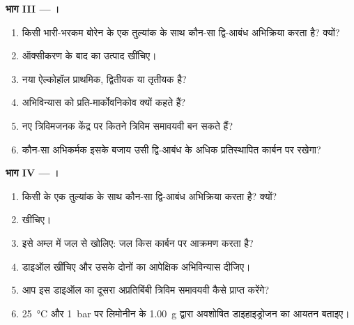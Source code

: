 \begin{problem}
\medskip
\noindent\textbf{भाग III --- ।}
\begin{enumerate}[resume]
  \item किसी भारी-भरकम बोरेन के एक तुल्यांक के साथ कौन-सा द्वि-आबंध अभिक्रिया करता है? क्यों?
  \item ऑक्सीकरण के बाद का उत्पाद खींचिए।
  \item नया ऐल्कोहॉल प्राथमिक, द्वितीयक या तृतीयक है?
  \item अभिविन्यास को प्रति-मार्कोवनिकोव क्यों कहते हैं?
  \item नए त्रिविमजनक केंद्र पर कितने त्रिविम समावयवी बन सकते हैं?
  \item कौन-सा अभिकर्मक इसके बजाय उसी द्वि-आबंध के अधिक प्रतिस्थापित कार्बन पर 
        रखेगा?
\end{enumerate}

\medskip
\noindent\textbf{भाग IV --- ।}
\begin{enumerate}[resume]
  \item किसी  के एक तुल्यांक के साथ कौन-सा द्वि-आबंध अभिक्रिया करता है? क्यों?
  \item {} खींचिए।
  \item इसे अम्ल में जल से खोलिए: जल किस कार्बन पर आक्रमण करता है?
  \item डाइऑल खींचिए और उसके दोनों  का आपेक्षिक अभिविन्यास दीजिए।
  \item आप इस डाइऑल का दूसरा अप्रतिबिंबी त्रिविम समावयवी कैसे प्राप्त करेंगे?
  \item \qty{25}{\degreeCelsius} और \qty{1}{bar} पर लिमोनीन के \qty{1.00}{g} द्वारा
        अवशोषित डाइहाइड्रोजन का आयतन बताइए।
\end{enumerate}
\end{problem}
